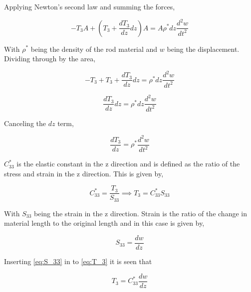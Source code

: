 Applying Newton's second law and summing the forces,

\begin{equation}
-T_3A + (T_3 + \frac{dT_3}{dz}dz)A = A\rho^* dz \frac{d^2w}{dt^2}
\end{equation}


With $\rho^*$ being the density of the rod material and $w$ being the displacement. Dividing through by the area,

\begin{equation}
-T_3 + T_3 + \frac{dT_3}{dz}dz = \rho^* dz \frac{d^2w}{dt^2}
\end{equation}

\begin{equation}
\frac{dT_3}{dz}dz = \rho^* dz \frac{d^2w}{dt^2}
\end{equation}

Canceling the $dz$ term,

\begin{equation}
\frac{dT_3}{dz} = \rho^* \frac{d^2w}{dt^2}
\label{eq:strainWave}
\end{equation}

$C^*_{33}$ is the elastic constant in the z direction and is defined as the ratio of the stress and strain in the z direction. This is given by,

\begin{equation}
C^*_{33} = \frac{T_3}{S_{33}} \implies T_3 = C^*_{33}S_{33}
\label{eq:T_3}
\end{equation}


With $S_{33}$ being the strain in the z direction. Strain is the ratio of the change in material length to the original length and in this case is given by,

\begin{equation}
S_{33} = \frac{dw}{dz}
\label{eq:S_33}
\end{equation}


Inserting \ref{eq:S_33} in to \ref{eq:T_3} it is seen that

\begin{equation}
T_3 = C^*_{33}\frac{dw}{dz}
\label{eq:T_3fin}
\end{equation}

